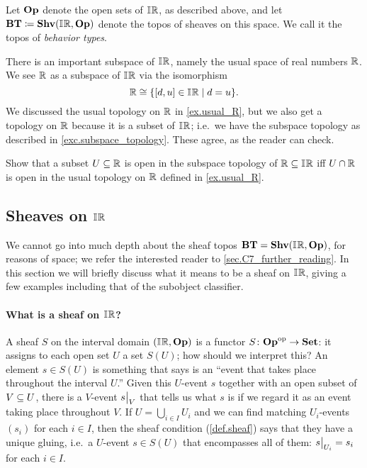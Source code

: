 \documentclass[7Sketches]{subfiles}
\begin{document}
Let $\Op$ denote the open sets of $\IR$, as described above, and let $\Cat{BT}\coloneqq\Shv(\IR,\Op)$ denote the topos of sheaves on this space. We call it the topos of \emph{behavior types}.

There is an important subspace of $\IR$, namely the usual space of real numbers $\RR$. We see $\RR$ as a subspace of $\IR$ via the isomorphism
\[\RR\cong\{[d,u]\in\IR\mid d=u\}.\]
We discussed the usual topology on $\RR$ in \cref{ex.usual_R}, but we also get a topology on $\RR$ because it is a subset of $\IR$; i.e.\ we have the subspace topology as described in \cref{exc.subspace_topology}. These agree, as the reader can check.

\begin{exercise}%
\label{exc.R_subsp_IR}
Show that a subset $U\ss\RR$ is open in the subspace topology of $\RR\ss\IR$ iff $U\cap\RR$ is open in the usual topology on $\RR$ defined in \cref{ex.usual_R}.
\end{exercise}

\subsection{Sheaves on $\IR$}

We cannot go into much depth about the sheaf topos $\Cat{BT}=\Shv(\IR,\Op)$, for reasons of space; we refer the interested reader to \cref{sec.C7_further_reading}. In this section we will briefly discuss what it means to be a sheaf on $\IR$, giving a few examples including that of the subobject classifier. 


\paragraph{What is a sheaf on $\IR$?}%

A sheaf $S$ on the interval domain $(\IR,\Op)$ is a functor $S\colon\Op\op\to\smset$:
it assigns to each open set $U$ a set $S(U)$; how should we interpret this? An
element $s\in S(U)$ is something that says is an ``event that takes place throughout the interval $U$.'' Given this $U$-event $s$ together with an open subset of
$V\ss U$, there is a $V$-event $\restrict{s}{V}$ that tells us what $s$ is if we regard it as an event taking place
throughout $V$. If $U=\bigcup_{i\in I}U_i$ and we can find matching $U_i$-events $(s_i)$ for each $i\in I$, then the sheaf condition (\cref{def.sheaf}) says that they have a unique gluing, i.e.\ a $U$-event $s\in S(U)$ that encompasses all of them: $\restrict{s}{U_i}=s_i$ for each $i\in I$.
\end{document}
